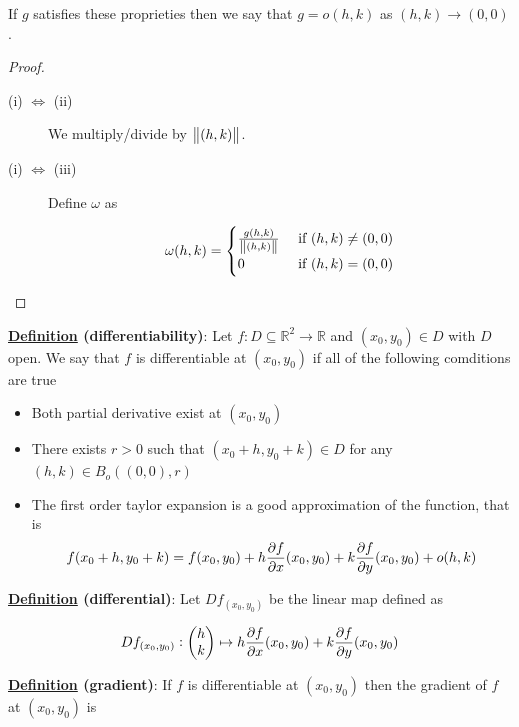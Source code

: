 \documentclass[10pt]{extarticle}
\newcommand{\R}{\mathbb{R}}
\newcommand{\skiplineafterproof}{$ $\par\nobreak\ignorespaces}
\begin{document}
If $g$ satisfies these proprieties then we say that $g = o(h,k)$ as $(h,k) \to (0,0)$.

\begin{proof}
    \skiplineafterproof
    \begin{description}
        \item[(i) $\iff$ (ii)]
            We multiply/divide by $\norm{(h,k)}$.

        \item[(i) $\iff$ (iii)]
            Define $\omega$ as

            $$
                \omega(h,k) = \begin{cases}
                    \frac{g(h,k)}{\norm{(h,k)}} & \text{ if } (h,k) \neq (0,0) \\
                    0                           & \text{ if } (h,k) = (0,0)
                \end{cases}
            $$
    \end{description}
\end{proof}

\textbf{\underline{Definition} (differentiability)}:
Let $f: D \subseteq \R^2 \to \R$ and $(x_0, y_0) \in D$ with $D$ open.
We say that $f$ is differentiable at $(x_0, y_0)$ if all of the following comditions are true
\begin{itemize}
    \item Both partial derivative exist at $(x_0, y_0)$
    \item There exists $r > 0$ such that $(x_0 + h, y_0 + k) \in D$ for any $(h, k) \in B_o \left((0,0), r\right)$
    \item The first order taylor expansion is a good approximation of the function, that is
          $$
              f(x_0 + h, y_0 + k) = f(x_0, y_0) + h \pdv{f}{x}()(x_0, y_0) + k \pdv{f}{y}()(x_0, y_0) + o(h, k)
          $$
\end{itemize}

\textbf{\underline{Definition} (differential)}:
Let $Df_{(x_0, y_0)}$ be the linear map defined as

$$
    Df_{(x_0, y_0)}: \begin{pmatrix}
        h \\ k
    \end{pmatrix}
    \mapsto h \pdv{f}{x}()(x_0, y_0) + k \pdv{f}{y}()(x_0, y_0)
$$

\textbf{\underline{Definition} (gradient)}:
If $f$ is differentiable at $(x_0, y_0)$ then the gradient of $f$ at $(x_0, y_0)$ is
\end{document}
